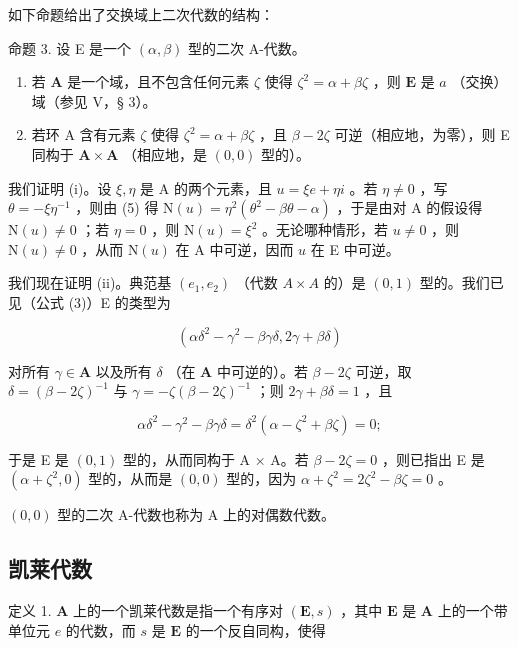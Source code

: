 如下命题给出了交换域上二次代数的结构：

命题 3. 设 E 是一个 \((\alpha, \beta)\) 型的二次 A-代数。

\begin{enumerate}
\def\labelenumi{(\roman{enumi})}
\item
  若 \(\mathbf{A}\) 是一个域，且不包含任何元素 \(\zeta\) 使得 \(\zeta^2 = \alpha + \beta \zeta\) ，则 \(\mathbf{E}\) 是 \(a\) （交换）域（参见 V，§ 3）。
\item
  若环 A 含有元素 \(\zeta\) 使得 \(\zeta^2 = \alpha + \beta\zeta\) ，且 \(\beta - 2\zeta\) 可逆（相应地，为零），则 E 同构于 \(\mathbf{A} \times \mathbf{A}\) （相应地，是 \((0,0)\) 型的）。
\end{enumerate}

我们证明 (i)。设 \(\xi, \eta\) 是 A 的两个元素，且 \(u = \xi e + \eta i\) 。若 \(\eta \neq 0\) ，写 \(\theta = -\xi \eta^{-1}\) ，则由 (5) 得 \(\mathrm{N}(u) = \eta^2 (\theta^2 - \beta \theta - \alpha)\) ，于是由对 A 的假设得 \(\mathrm{N}(u) \neq 0\) ；若 \(\eta = 0\) ，则 \(\mathrm{N}(u) = \xi^2\) 。无论哪种情形，若 \(u \neq 0\) ，则 \(\mathrm{N}(u) \neq 0\) ，从而 \(\mathrm{N}(u)\) 在 A 中可逆，因而 \(u\) 在 E 中可逆。

我们现在证明 (ii)。典范基 \((e_{1}, e_{2})\) （代数 \(A \times A\) 的）是 \((0, 1)\) 型的。我们已见（公式 (3)）E 的类型为

\[
(\alpha \delta^ {2} - \gamma^ {2} - \beta \gamma \delta , 2 \gamma + \beta \delta)
\]

对所有 \(\gamma \in \mathbf{A}\) 以及所有 \(\delta\) （在 \(\mathbf{A}\) 中可逆的）。若 \(\beta - 2\zeta\) 可逆，取 \(\delta = (\beta - 2\zeta)^{-1}\) 与 \(\gamma = -\zeta(\beta - 2\zeta)^{-1}\) ；则 \(2\gamma + \beta\delta = 1\) ，且

\[
\alpha \delta^ {2} - \gamma^ {2} - \beta \gamma \delta = \delta^ {2} (\alpha - \zeta^ {2} + \beta \zeta) = 0;
\]

于是 E 是 \((0,1)\) 型的，从而同构于 A × A。若 \(\beta - 2\zeta = 0\) ，则已指出 E 是 \((\alpha + \zeta^{2}, 0)\) 型的，从而是 \((0,0)\) 型的，因为 \(\alpha + \zeta^{2} = 2\zeta^{2} - \beta\zeta = 0\) 。

\((0,0)\) 型的二次 A-代数也称为 A 上的对偶数代数。

\subsection{凯莱代数}

定义 1. \(\mathbf{A}\) 上的一个凯莱代数是指一个有序对 \((\mathbf{E}, s)\) ，其中 \(\mathbf{E}\) 是 \(\mathbf{A}\) 上的一个带单位元 \(e\) 的代数，而 \(s\) 是 \(\mathbf{E}\) 的一个反自同构，使得

